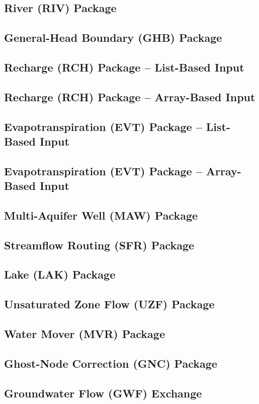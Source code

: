 \newpage
\subsection{River (RIV) Package}


\newpage
\subsection{General-Head Boundary (GHB) Package}


\newpage
\subsection{Recharge (RCH) Package -- List-Based Input}


\newpage
\subsection{Recharge (RCH) Package -- Array-Based Input}


\newpage
\subsection{Evapotranspiration (EVT) Package -- List-Based Input}


\newpage
\subsection{Evapotranspiration (EVT) Package -- Array-Based Input}


\newpage
\subsection{Multi-Aquifer Well (MAW) Package}


\newpage
\subsection{Streamflow Routing (SFR) Package}


\newpage
\subsection{Lake (LAK) Package}


\newpage
\subsection{Unsaturated Zone Flow (UZF) Package}


\newpage
\subsection{Water Mover (MVR) Package}


\newpage
\subsection{Ghost-Node Correction (GNC) Package}


\newpage
\subsection{Groundwater Flow (GWF) Exchange}


